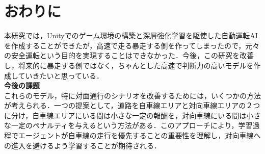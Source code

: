 \section{おわりに}
本研究では，Unityでのゲーム環境の構築と深層強化学習を駆使した自動運転AIを作成することができたが，高速で走る暴走する側を作ってしまったので，元々の安全運転という目的を実現することはできなかった．今後，この研究を改善し，将来的に暴走する側ではなく，ちゃんとした高速で判断力の高いモデルを作成していきたいと思っている．\\

\noindent
\textbf{今後の課題}\\
これらのモデル，特に対面通行のシナリオを改善するためには，いくつかの方法が考えられる．一つの提案として，道路を自車線エリアと対向車線エリアの２つに分け，自車線エリアにいる間は小さな一定の報酬を，対向車線にいる間は小さな一定のペナルティを与えるという方法がある．このアプローチにより，学習過程でエージェントが自車線の走行を優先することの重要性を理解し，対向車線への進入を避けるよう学習することが期待される．
